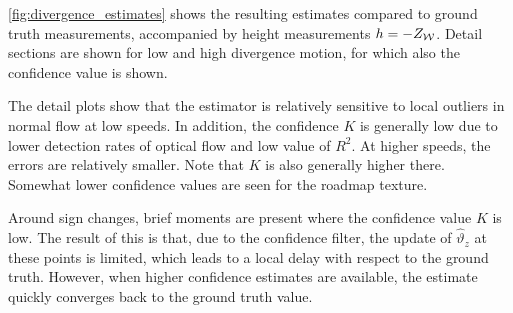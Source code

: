 \cref{fig:divergence_estimates} shows the resulting estimates compared to ground truth measurements, accompanied by height measurements $h=-Z_{\cal W}$. Detail sections are shown for low and high divergence motion, for which also the confidence value is shown. 

\begin{figure*}[!ht]
	\centering
	\setlength{\fwidth}{0.4\linewidth}
	\begin{framed}
		\caption{From top to bottom: Height measurements (top row) and estimates of $\vartheta_z$ (second row, red line) in comparison to ground truth measurements (blue line). The two bottom rows show detail sections of $\vartheta_z$ estimates (third row) at low speed and high speed, as well as the accompanying estimate confidence value $K$ (bottom row). Measurements are shown for \protect{} checkerboard and \protect{} roadmap textures separately.}
		\label{fig:divergence_estimates}
	\end{framed}
\end{figure*}

The detail plots show that the estimator is relatively sensitive to local outliers in normal flow at low speeds. In addition, the confidence $K$ is generally low due to lower detection rates of optical flow and low value of $R^2$. At higher speeds, the errors are relatively smaller. Note that $K$ is also generally higher there. Somewhat lower confidence values are seen for the roadmap texture.

Around sign changes, brief moments are present where the confidence value $K$ is low. The result of this is that, due to the confidence filter, the update of $\hat{\vartheta}_z$ at these points is limited, which leads to a local delay with respect to the ground truth. However, when higher confidence estimates are available, the estimate quickly converges back to the ground truth value.

